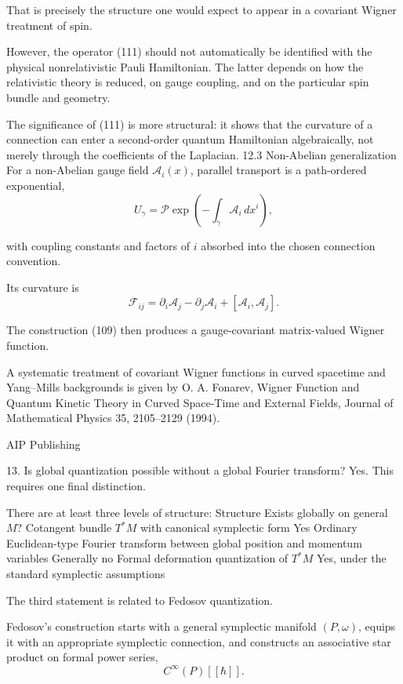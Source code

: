 That is precisely the structure one would expect to appear in a covariant Wigner treatment of spin.

However, the operator (111) should not automatically be identified with the physical nonrelativistic Pauli Hamiltonian. The latter depends on how the relativistic theory is reduced, on gauge coupling, and on the particular spin bundle and geometry.

The significance of (111) is more structural: it shows that the curvature of a connection can enter a second-order quantum Hamiltonian algebraically, not merely through the coefficients of the Laplacian.
12.3 Non-Abelian generalization
For a non-Abelian gauge field \(\mathcal A_i(x)\), parallel transport is a path-ordered exponential,
\[
U_\gamma=
\mathcal P\exp\left(
-\int_\gamma\mathcal A_i\,dx^i
\right),
\tag{112}
\]

with coupling constants and factors of \(i\) absorbed into the chosen connection convention.

Its curvature is
\[
\mathcal F_{ij}
=
\partial_i\mathcal A_j
-
\partial_j\mathcal A_i
+
[\mathcal A_i,\mathcal A_j].
\tag{113}
\]

The construction (109) then produces a gauge-covariant matrix-valued Wigner function.

A systematic treatment of covariant Wigner functions in curved spacetime and Yang–Mills backgrounds is given by O. A. Fonarev, Wigner Function and Quantum Kinetic Theory in Curved Space-Time and External Fields, Journal of Mathematical Physics 35, 2105–2129 (1994). 

AIP Publishing




13. Is global quantization possible without a global Fourier transform?
Yes. This requires one final distinction.

There are at least three levels of structure:
Structure	Exists globally on general \(M\)?
Cotangent bundle \(T^*M\) with canonical symplectic form	Yes
Ordinary Euclidean-type Fourier transform between global position and momentum variables	Generally no
Formal deformation quantization of \(T^*M\)	Yes, under the standard symplectic assumptions

The third statement is related to Fedosov quantization.

Fedosov's construction starts with a general symplectic manifold \((P,\omega)\), equips it with an appropriate symplectic connection, and constructs an associative star product on formal power series,
\[
C^\infty(P)[[\hbar]].
\]

